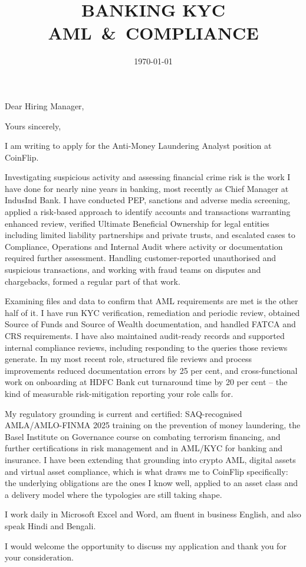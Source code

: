 \documentclass[11pt,a4paper,sans]{moderncv}
\title{BANKING \textbar{} KYC \textbar{} \mbox{AML \& COMPLIANCE}}
\begin{document}
\date{\today}
\opening{Dear Hiring Manager,}
\closing{Yours sincerely,}

\makelettertitle

I am writing to apply for the Anti-Money Laundering Analyst position at
CoinFlip.

Investigating suspicious activity and assessing financial crime risk is the
work I have done for nearly nine years in banking, most recently as Chief
Manager at IndusInd Bank. I have conducted PEP, sanctions and adverse media
screening, applied a risk-based approach to identify accounts and transactions
warranting enhanced review, verified Ultimate Beneficial Ownership for legal
entities including limited liability partnerships and private trusts, and
escalated cases to Compliance, Operations and Internal Audit where activity or
documentation required further assessment. Handling customer-reported
unauthorised and suspicious transactions, and working with fraud teams on
disputes and chargebacks, formed a regular part of that work.

Examining files and data to confirm that AML requirements are met is the other
half of it. I have run KYC verification, remediation and periodic review,
obtained Source of Funds and Source of Wealth documentation, and handled
FATCA and CRS requirements. I have also maintained audit-ready records and
supported internal compliance reviews, including responding to the queries
those reviews generate. In my most recent role, structured file reviews and
process improvements reduced documentation errors by 25 per cent, and
cross-functional work on onboarding at HDFC Bank cut turnaround time by 20 per
cent -- the kind of measurable risk-mitigation reporting your role calls for.

My regulatory grounding is current and certified: SAQ-recognised
AMLA/AMLO-FINMA 2025 training on the prevention of money laundering, the Basel
Institute on Governance course on combating terrorism financing, and further
certifications in risk management and in AML/KYC for banking and insurance. I
have been extending that grounding into crypto AML, digital assets and virtual
asset compliance, which is what draws me to CoinFlip specifically: the
underlying obligations are the ones I know well, applied to an asset class and
a delivery model where the typologies are still taking shape.

I work daily in Microsoft Excel and Word, am fluent in business English, and
also speak Hindi and Bengali.

I would welcome the opportunity to discuss my application and thank you for
your consideration.

\makeletterclosing
\end{document}
